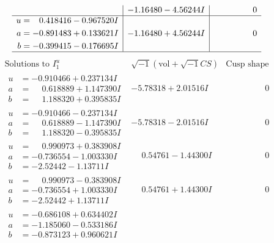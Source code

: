 \documentclass[1p]{elsarticle_modified}
\theoremstyle{definition}
\newcommand{\I}{\sqrt{-1}}
\begin{document}
$$\begin{array}{c|c|c}
 & -1.16480 - 4.56244 I & \phantom{-0.000000 } 0 \\ \hline\begin{aligned}
u &= \phantom{-}0.418416 - 0.967520 I \\
a &= -0.891483 + 0.133621 I \\
b &= -0.399415 - 0.176695 I\end{aligned}
 & -1.16480 + 4.56244 I & \phantom{-0.000000 } 0\\
 \hline 
 \end{array}$$\newpage$$\begin{array}{c|c|c}  
\text{Solutions to }I^u_{1}& \I (\text{vol} + \sqrt{-1}CS) & \text{Cusp shape}\\
 \hline 
\begin{aligned}
u &= -0.910466 + 0.237134 I \\
a &= \phantom{-}0.618889 + 1.147390 I \\
b &= \phantom{-}1.188320 + 0.395835 I\end{aligned}
 & -5.78318 + 2.01516 I & \phantom{-0.000000 } 0 \\ \hline\begin{aligned}
u &= -0.910466 - 0.237134 I \\
a &= \phantom{-}0.618889 - 1.147390 I \\
b &= \phantom{-}1.188320 - 0.395835 I\end{aligned}
 & -5.78318 - 2.01516 I & \phantom{-0.000000 } 0 \\ \hline\begin{aligned}
u &= \phantom{-}0.990973 + 0.383908 I \\
a &= -0.736554 - 1.003330 I \\
b &= -2.52442 - 1.13711 I\end{aligned}
 & \phantom{-}0.54761 - 1.44300 I & \phantom{-0.000000 } 0 \\ \hline\begin{aligned}
u &= \phantom{-}0.990973 - 0.383908 I \\
a &= -0.736554 + 1.003330 I \\
b &= -2.52442 + 1.13711 I\end{aligned}
 & \phantom{-}0.54761 + 1.44300 I & \phantom{-0.000000 } 0 \\ \hline\begin{aligned}
u &= -0.686108 + 0.634402 I \\
a &= -1.185060 - 0.533186 I \\
b &= -0.873123 + 0.960621 I\end{aligned}

\end{array}$$
\end{document}
